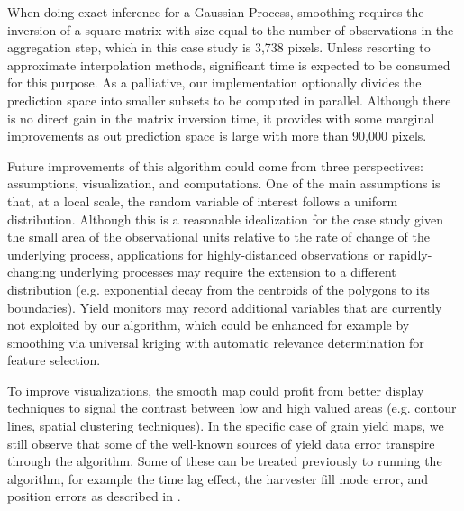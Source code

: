 
When doing exact inference for a Gaussian Process, smoothing requires
the inversion of a square matrix with size equal to the number of
observations in the aggregation step, which in this case study is
3,738 pixels. Unless resorting to approximate interpolation methods,
significant time is expected to be consumed for this purpose. As a
palliative, our implementation optionally divides the prediction space
into smaller subsets to be computed in parallel. Although there is no
direct gain in the matrix inversion time, it provides with some
marginal improvements as out prediction space is large with more than
90,000 pixels.

 Future improvements of this
algorithm could come from three perspectives: assumptions,
visualization, and computations. One of the main assumptions is that,
at a local scale, the random variable of interest follows a uniform
distribution. Although this is a reasonable idealization for the case
study given the small area of the observational units relative to the
rate of change of the underlying process, applications for
highly-distanced observations or rapidly-changing underlying processes
may require the extension to a different distribution
(e.g. exponential decay from the centroids of the polygons to its
boundaries). Yield monitors may record additional variables that are
currently not exploited by our algorithm, which could be enhanced for
example by smoothing via universal kriging with automatic relevance
determination for feature selection.

 To improve visualizations,
the smooth map could profit from better display techniques to signal
the contrast between low and high valued areas (e.g. contour lines,
spatial clustering techniques). In the specific case of grain yield
maps, we still observe that some of the well-known sources of yield
data error transpire through the algorithm. Some of these can be
treated previously to running the algorithm, for example the time lag
effect, the harvester fill mode error, and position errors as
described in \cite{Blackmore1999}.

